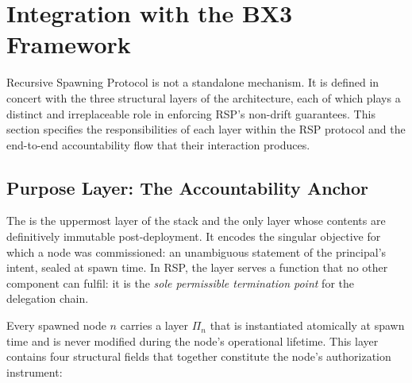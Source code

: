 
\section{Integration with the BX3 Framework}
\label{sec:integration}

Recursive Spawning Protocol is not a standalone mechanism. It is defined in concert with the three structural layers of the \bxthree architecture, each of which plays a distinct and irreplaceable role in enforcing RSP's non-drift guarantees. This section specifies the responsibilities of each layer within the RSP protocol and the end-to-end accountability flow that their interaction produces.

\subsection{Purpose Layer: The Accountability Anchor}

The \purpose is the uppermost layer of the \bxthree stack and the only layer whose contents are definitively immutable post-deployment. It encodes the singular objective for which a node was commissioned: an unambiguous statement of the principal's intent, sealed at spawn time. In RSP, the \purpose layer serves a function that no other component can fulfil: it is the \emph{sole permissible termination point} for the delegation chain.

Every spawned node $n$ carries a \purpose layer $\Pi_n$ that is instantiated atomically at spawn time and is never modified during the node's operational lifetime. This layer contains four structural fields that together constitute the node's authorization instrument:

